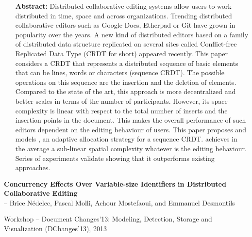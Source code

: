 \begin{itemize}
\item [\textbf{Abstract:}] {\small Distributed collaborative editing systems
    allow users to work distributed in time, space and across
    organizations. Trending distributed collaborative editors such as Google
    Docs, Etherpad or Git have grown in popularity over the years. A new kind of
    distributed editors based on a family of distributed data structure
    replicated on several sites called Conflict-free Replicated Data Type (CRDT
    for short) appeared recently. This paper considers a CRDT that represents a
    distributed sequence of basic elements that can be lines, words or
    characters (sequence CRDT). The possible operations on this sequence are the
    insertion and the deletion of elements. Compared to the state of the art,
    this approach is more decentralized and better scales in terms of the number
    of participants. However, its space complexity is linear with respect to the
    total number of inserts and the insertion points in the document. This makes
    the overall performance of such editors dependent on the editing behaviour
    of users. This paper proposes and models \LSEQ, an adaptive allocation
    strategy for a sequence CRDT. \LSEQ achieves in the average a sub-linear
    spatial complexity whatever is the editing behaviour. Series of experiments
    validate \LSEQ showing that it outperforms existing approaches.}
\end{itemize}

\noindent \textbf{Concurrency Effects Over Variable-size Identifiers in Distributed
Collaborative Editing}\\
\indent -- Brice Nédelec, Pascal Molli, Achour Mostefaoui, and Emmanuel Desmontils

\noindent Workshop -- Document Changes'13: Modeling, Detection, Storage and
Visualization (DChanges'13), 2013

